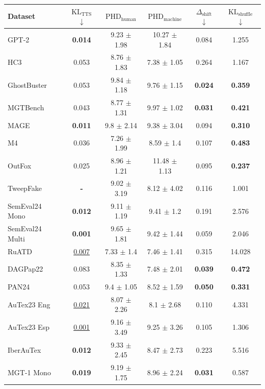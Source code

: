 \begin{table}[h!t]
    \centering
    \begin{tabular}{l|c|c|c|c|c}
    \toprule
        Dataset & $\text{KL}_{\text{TTS}}$ $\downarrow$ & $\text{PHD}_{\text{human}}$ & $\text{PHD}_{\text{machine}}$ &  $\Delta_{\text{shift}}$ $\downarrow$ &  $\text{KL}_\text{shuffle}$ $\downarrow$  \\
    \midrule
        GPT-2 & \textbf{0.014} & 9.23 $\pm$ 1.98 & 10.27 $\pm$ 1.84 &  0.084 & 1.255  \\
        HC3 & 0.053  & 8.76 $\pm$ 1.83 & 7.38 $\pm$ 1.05 & 0.264 &   1.167  \\
        GhostBuster & 0.053 & 9.84 $\pm$ 1.18 & 9.76 $\pm$ 1.15 & \textbf{0.024} &  \textbf{0.359}  \\
        MGTBench & 0.043  & 8.77 $\pm$ 1.31 & 9.97 $\pm$ 1.02 &  \textbf{0.031} &   \textbf{0.421} \\
        MAGE & \textbf{0.011}  & 9.8 $\pm$ 2.14 & 9.38 $\pm$ 3.04 & 0.094  & \textbf{0.310}  \\
        M4 & 0.036 & 7.26 $\pm$ 1.99 & 8.59 $\pm$ 1.4 & 0.107 &  \textbf{0.483}  \\
        OutFox & 0.025  & 8.96 $\pm$ 1.21 & 11.48 $\pm$ 1.13  & 0.095 & \textbf{0.237} \\
        TweepFake & \textbf{-} & 9.02 $\pm$ 3.19 & 8.12 $\pm$ 4.02 & 0.116 & 1.001 \\
    \midrule
        SemEval24 Mono & \textbf{0.012} & 9.11 $\pm$ 1.19 & 9.41 $\pm$ 1.2 &    0.191 &  2.576  \\
        SemEval24 Multi & \textbf{0.001}  & 9.65 $\pm$ 1.81 & 9.42 $\pm$ 1.44 &  0.059 &  2.046  \\
        RuATD & \underline{0.007} & 7.33 $\pm$ 1.4 & 7.46 $\pm$ 1.41 &  0.315 &  14.028  \\
        DAGPap22 & 0.083 & 8.35 $\pm$ 1.33 & 7.48 $\pm$ 2.01 &  \textbf{0.039} &   \textbf{0.472}  \\
        PAN24 & 0.053 & 9.4 $\pm$ 1.05 & 8.52 $\pm$ 1.59 &  \textbf{0.050} &  \textbf{0.331}  \\
        AuTex23 Eng & \underline{0.021} & 8.07 $\pm$ 2.26 & 8.1 $\pm$ 2.68 &  0.110 &  4.331 \\
        AuTex23 Esp &  \underline{0.001}& 9.16 $\pm$ 3.49 & 9.25 $\pm$ 3.26  &   0.105  &   1.306 \\
        IberAuTex & \textbf{0.012} & 9.33 $\pm$ 2.45 & 8.47 $\pm$ 2.73 &  0.223 & 5.516 \\
        MGT-1 Mono & \textbf{0.019} & 9.19 $\pm$ 1.75 & 8.96 $\pm$ 2.24 & \textbf{0.031} & 0.587\\

\end{tabular}
\end{table}
